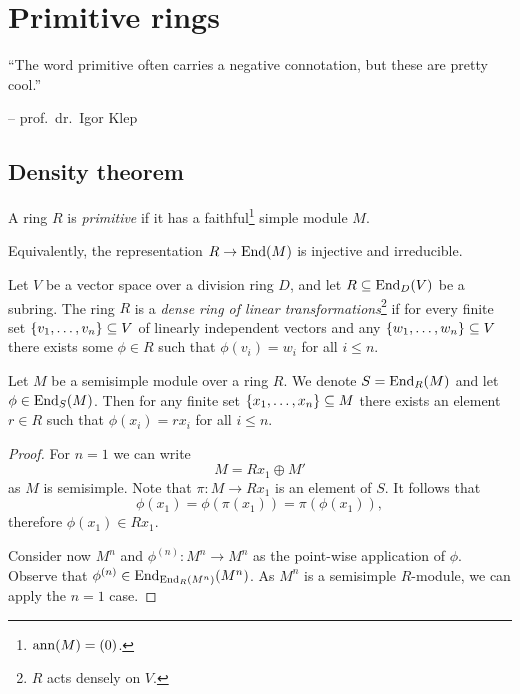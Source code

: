 \section{Primitive rings}

\epigraph{``The word primitive often carries a negative
connotation, but these are pretty cool.''}{-- prof.~dr.~Igor Klep}

\subsection{Density theorem}


\begin{definicija}
A ring $R$ is \emph{primitive} if it has a
faithful\footnote{$\operatorname{ann}(M) = (0)$.} simple module $M$.
\end{definicija}

\begin{opomba}
Equivalently, the representation $R \to \operatorname{End}(M)$ is injective and
irreducible.
\end{opomba}

\begin{definicija}
Let $V$ be a vector space over a division ring $D$, and let
$R \subseteq \operatorname{End}_D(V)$ be a subring. The ring $R$ is a
\emph{dense ring of linear transformations}\footnote{$R$
acts densely on $V$.} if for every finite set
$\left\{v_1, \dots, v_n\right\} \subseteq V$ of linearly independent vectors
and any $\left\{w_1, \dots, w_n\right\} \subseteq V$ there exists some
$\phi \in R$ such that $\phi(v_i) = w_i$ for all $i \leq n$.
\end{definicija}

\begin{izrek}[Density]
Let $M$ be a semisimple module over a ring $R$. We denote
$S = \operatorname{End}_R(M)$ and let $\phi \in \operatorname{End}_S(M)$. Then for any finite
set $\left\{x_1, \dots, x_n\right\} \subseteq M$ there exists an element
$r \in R$ such that $\phi(x_i) = r x_i$ for all $i \leq n$.
\end{izrek}

\begin{proof}
For $n = 1$ we can write
\[
M = R x_1 \oplus M'
\]
as $M$ is semisimple. Note that $\pi \colon M \to R x_1$ is an
element of $S$. It follows that
\[
\phi(x_1) = \phi(\pi(x_1)) = \pi(\phi(x_1)),
\]
therefore $\phi(x_1) \in R x_1$.

Consider now $M^n$ and $\phi^{(n)} \colon M^n \to M^n$ as the
point-wise application of $\phi$. Observe that
$\phi^{(n)} \in \operatorname{End}_{\operatorname{End}_R(M^n)}(M^n)$. As $M^n$ is a semisimple
$R$-module, we can apply the $n=1$ case.
\end{proof}

